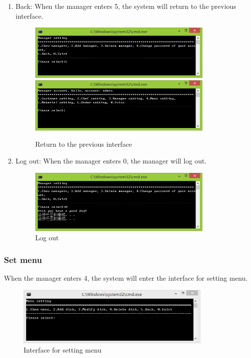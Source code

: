 \documentclass{article}
\begin{document}
\begin{enumerate}
    \item Back:\newline 
    When the manager enters 5, the system will return to the previous interface.
        \begin{figure}[H]
        \centering
        \includegraphics[width=0.85\textwidth]{C/C5a.jpg}
        \includegraphics[width=0.85\textwidth]{C/C5b.jpg}
        \caption{Return to the previous interface}
        \end{figure}
    
    \item Log out:\newline
    When the manager enters 0, the manager will log out.
        \begin{figure}[H]
        \centering
        \includegraphics[width=0.85\textwidth]{C/C0.jpg}
        \caption{Log out}
        \end{figure}
    
\end{enumerate}


\subsubsection{Set menu}
When the manager enters 4, the system will enter the interface for setting menu.
\begin{figure}[H]
    \centering
    \includegraphics[width=0.85\textwidth]{D/02.jpg}
    \caption{Interface for setting menu}
\end{figure}
\end{document}

